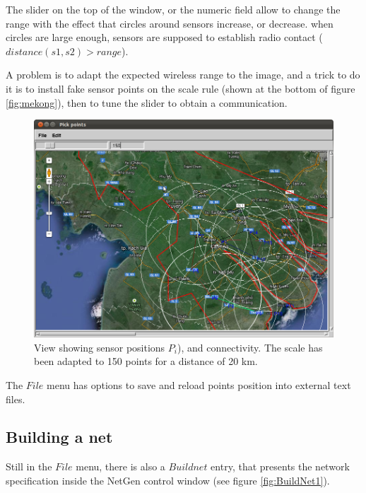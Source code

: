 \documentclass[times,a4paper]{book}
\begin{document}
The slider on the top of the window, or the numeric field allow to change the range
with the effect that circles around sensors increase, or decrease. when circles
are large enough, sensors are supposed to establish radio contact ($distance(s1,s2) > range$).

A problem is to adapt the expected wireless range to the image, and a  trick
to do it is to install  fake sensor points on the scale rule (shown at the bottom of figure \ref{fig:mekong}), then to tune the slider
to obtain a communication.


\begin{figure}[hbtp]
\begin{center} 
\includegraphics[width=12cm]{PickPoints3.png}
\caption{View showing sensor positions $P_i$), and connectivity.
The scale has been adapted to 150 points for a distance of 20 km.
}
\label{fig:PickPoints3}
\end{center}
\end{figure}

The $File$ menu has options   to save and reload  points position into external text files.

\subsection{Building a net}

Still in the $File$ menu, there is also a $Build net$ entry, that presents the network specification 
inside the NetGen control window (see figure 
\ref{fig:BuildNet1}).
\end{document}
